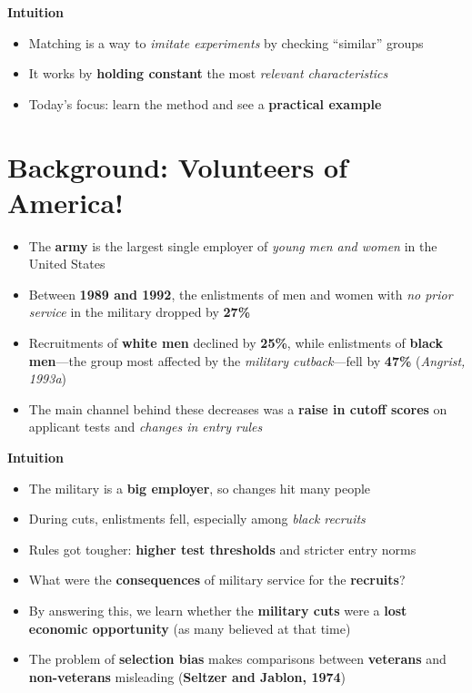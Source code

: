 \documentclass[12pt]{article}
\begin{document}
\textbf{Intuition}
\begin{itemize}
    \item Matching is a way to \textit{imitate experiments} by checking “similar” groups
    \item It works by \textbf{holding constant} the most \textit{relevant characteristics}
    \item Today’s focus: learn the method and see a \textbf{practical example}
\end{itemize}

\section*{\noindent\textbf{Background: Volunteers of America!}}

\begin{itemize}
    \item The \textbf{army} is the largest single employer of \textit{young men and women} in the United States
    \item Between \textbf{1989 and 1992}, the enlistments of men and women with \textit{no prior service} in the military dropped by \textbf{27\%}
    \item Recruitments of \textbf{white men} declined by \textbf{25\%}, while enlistments of \textbf{black men}—the group most affected by the \textit{military cutback}—fell by \textbf{47\%} (\textit{Angrist, 1993a})
    \item The main channel behind these decreases was a \textbf{raise in cutoff scores} on applicant tests and \textit{changes in entry rules}
\end{itemize}

\textbf{Intuition}
\begin{itemize}
    \item The military is a \textbf{big employer}, so changes hit many people
    \item During cuts, enlistments fell, especially among \textit{black recruits}
    \item Rules got tougher: \textbf{higher test thresholds} and stricter entry norms
\end{itemize}

\begin{itemize}
    \item What were the \textbf{consequences} of military service for the \textbf{recruits}?
    \item By answering this, we learn whether the \textbf{military cuts} were a \textbf{lost economic opportunity} (as many believed at that time)
    \item The problem of \textbf{selection bias} makes comparisons between \textbf{veterans} and \textbf{non-veterans} misleading (\textbf{Seltzer and Jablon, 1974})
\end{itemize}
\end{document}
